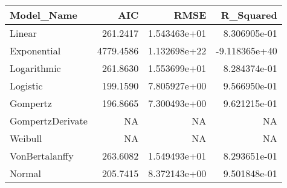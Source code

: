 
\begin{tabular}{lrrr}
\toprule
Model\_Name & AIC & RMSE & R\_Squared\\
\midrule
Linear & 261.2417 & 1.543463e+01 & 8.306905e-01\\
Exponential & 4779.4586 & 1.132698e+22 & -9.118365e+40\\
Logarithmic & 261.8630 & 1.553699e+01 & 8.284374e-01\\
Logistic & 199.1590 & 7.805927e+00 & 9.566950e-01\\
Gompertz & 196.8665 & 7.300493e+00 & 9.621215e-01\\
GompertzDerivate & NA & NA & NA\\
Weibull & NA & NA & NA\\
VonBertalanffy & 263.6082 & 1.549493e+01 & 8.293651e-01\\
Normal & 205.7415 & 8.372143e+00 & 9.501848e-01\\
\bottomrule
\end{tabular}
